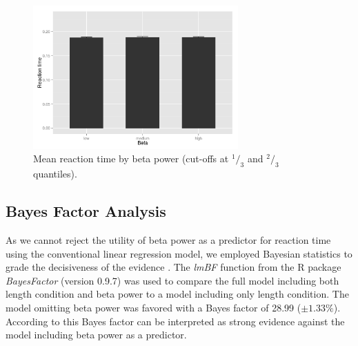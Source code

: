 \documentclass[man,floatsintext]{apa6} %
\begin{document}
\begin{figure}[!h]
  \includegraphics[width=0.7\textwidth]{actual_rt_by_beta}
  \caption{Mean reaction time by beta power (cut-offs at $^1/_3$ and $^2/_3$ quantiles).}
  \label{fig:rt_by_beta}
\end{figure}

\subsection{Bayes Factor Analysis}
As we cannot reject the utility of beta power as a predictor for
reaction time using the conventional linear regression model, we
employed Bayesian statistics to grade the decisiveness of the evidence
\cite{jeffreys_theory_1961}. The \emph{lmBF} function from the R
package \emph{BayesFactor} (version 0.9.7) was used to compare the
full model including both length condition and beta power to a model
including only length condition. The model omitting beta power was
favored with a Bayes factor of 28.99 ($\pm 1.33\%$). According to
 this Bayes factor can be interpreted as
strong evidence against the model including beta power as a predictor.
\end{document}
